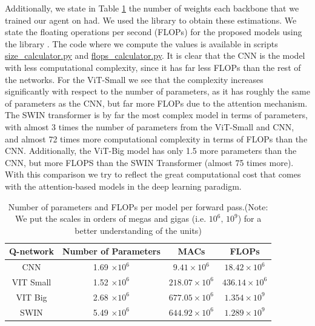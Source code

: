 Additionally, we state in Table \ref{tab:models_parameters} the number of weights each backbone that we trained our agent on had. We used the  \cite{torchinfo} library to obtain these estimations. We state the floating operations per second (FLOPs) for the proposed models using the  library \cite{ptflops}. The code where we compute the values is available in scripts \href{https://github.com/Javimh18/DL_TFM/blob/main/src/models/size_calculator.py}{size\_calculator.py} and \href{https://github.com/Javimh18/DL_TFM/blob/main/src/models/flops_calculator.py}{flops\_calculator.py}. It is clear that the CNN is the model with less computational complexity, since it has far less FLOPs than the rest of the networks. For the ViT-Small we see that the complexity increases significantly with respect to the number of parameters, as it has roughly the same of parameters as the CNN, but far more FLOPs due to the attention mechanism. The SWIN transformer is by far the most complex model in terms of parameters, with almost 3 times the number of parameters from the ViT-Small and CNN, and almost 72 times more computational complexity in terms of FLOPs than the CNN. Additionally, the ViT-Big model has only 1.5 more parameters than the CNN, but more FLOPS than the SWIN Transformer (almost 75 times more). With this comparison we try to reflect the great computational cost that comes with the attention-based models in the deep learning paradigm.

\begin{table}[h!]
	\begin{center}
		\caption[SWIN DDQN network hyper-parameters]{Number of parameters and FLOPs per model per forward pass.(Note: We put the scales in orders of megas and gigas (i.e. $10^6 \text{, } 10^9$) for a better understanding of the units)}
		\label{tab:models_parameters}
		\begin{tabular}{|c|c|c|c|}
			\hline
			Q-network & Number of Parameters & MACs & FLOPs \\  [0.5ex] 
			\hline
			\hline
			CNN & 1.69 $\times 10^6$ & $9.41 \times 10^6$ & $18.42 \times 10^6$ \\ 
			\hline
			VIT Small & 1.52 $\times 10^6$ & $218.07 \times 10^6$ & $436.14 \times 10^6$ \\ 
			\hline
			VIT Big & 2.68 $\times 10^6$ & $677.05 \times 10^6$ & $1.354 \times 10^9$ \\ 
			\hline
			SWIN & 5.49 $\times 10^6$ & $644.92 \times 10^6$ & $1.289 \times 10^9$ \\ 
			\hline
		\end{tabular}
	\end{center}
\end{table}

